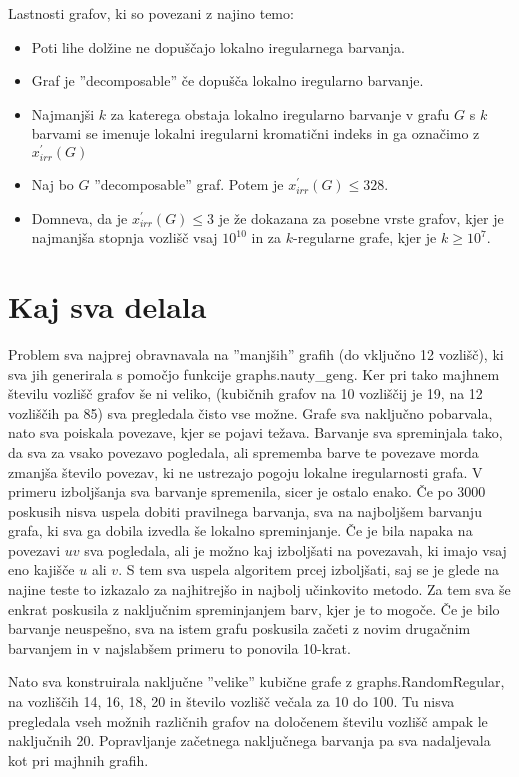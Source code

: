 \documentclass[12pt, a4paper]{article}
\begin{document}
Lastnosti grafov, ki so povezani z najino temo:
\begin{itemize}

\item Poti lihe dolžine ne dopuščajo lokalno iregularnega barvanja.
\item Graf je ''decomposable'' če dopušča lokalno iregularno barvanje.
\item Najmanjši $k$ za katerega obstaja lokalno iregularno barvanje v grafu $G$ s $k$ barvami se imenuje lokalni iregularni kromatični indeks in ga označimo z $x^'_{irr}(G)$
\item Naj bo $G$ ''decomposable'' graf. Potem je $x^'_{irr}(G) \leq 328$.
\item Domneva, da je $x^'_{irr}(G) \leq 3$ je že dokazana za posebne vrste grafov, kjer je najmanjša stopnja vozlišč vsaj $10^{10}$ in za $k$-regularne grafe, kjer je $k \geq 10^7$.

\end{itemize}


\newpage
\section{Kaj sva delala}

Problem sva najprej obravnavala na ”manjših” graﬁh (do vključno 12 vozlišč), ki sva jih generirala s pomočjo funkcije graphs.nauty_geng. Ker pri tako majhnem številu vozlišč grafov še ni veliko, (kubičnih grafov na 10 vozliščij je 19, na 12 vozliščih pa 85) sva pregledala čisto vse možne. Grafe sva naključno pobarvala, nato sva poiskala povezave, kjer se pojavi težava. Barvanje sva spreminjala tako, da sva za vsako povezavo pogledala, ali sprememba barve te povezave morda zmanjša število povezav, ki ne ustrezajo pogoju lokalne iregularnosti grafa. V primeru izboljšanja sva barvanje spremenila, sicer je ostalo enako. Če po 3000 poskusih nisva uspela dobiti pravilnega barvanja, sva na najboljšem barvanju grafa, ki sva ga dobila izvedla še lokalno spreminjanje. Če je bila napaka na povezavi $uv$ sva pogledala, ali je možno kaj izboljšati na povezavah, ki imajo vsaj eno kajišče $u$ ali $v$. S tem sva uspela algoritem prcej izboljšati, saj se je glede na najine teste to izkazalo za najhitrejšo in najbolj učinkovito metodo. Za tem sva še enkrat poskusila z naključnim spreminjanjem barv, kjer je to mogoče. Če je bilo barvanje neuspešno, sva na istem grafu poskusila začeti z novim drugačnim barvanjem in v najslabšem primeru to ponovila 10-krat.

Nato sva konstruirala naključne ”velike” kubične grafe z graphs.RandomRegular, na vozliščih 14, 16, 18, 20 in število vozlišč večala za 10 do 100. Tu nisva pregledala vseh možnih različnih grafov na določenem številu vozlišč ampak le naključnih 20. Popravljanje začetnega naključnega barvanja pa sva nadaljevala kot pri majhnih grafih.
\end{document}
